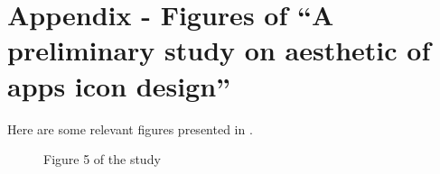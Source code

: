 \documentclass[a4paper,11pt] {article}
\theoremstyle{definition}
\begin{document}
\section{Appendix - Figures of ``A preliminary study on aesthetic of apps icon design''}
Here are some relevant figures presented in \cite{jpAnalitics}.
  \begin{figure}[H]
    \caption{Figure 5 of the study}\label{fig:jpfig5}
  \end{figure}
\end{document}
